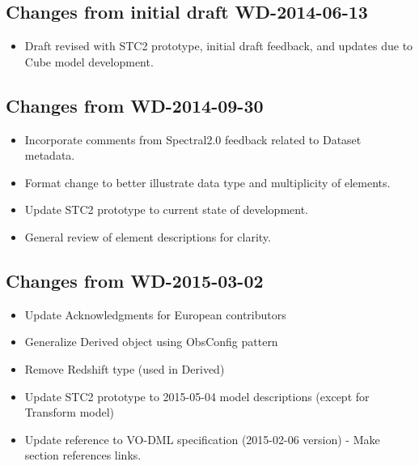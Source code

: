 

\subsection{Changes from initial draft WD-2014-06-13}
\begin{itemize} %
  \item  Draft revised with STC2 prototype, initial draft feedback, and updates due to Cube model development.
\end{itemize}

\subsection{Changes from WD-2014-09-30}
\begin{itemize} %
  \item Incorporate comments from Spectral2.0 feedback related to Dataset metadata.
  \item Format change to better illustrate data type and multiplicity of elements.
  \item Update STC2 prototype to current state of development.
  \item General review of element descriptions for clarity.
\end{itemize}

\subsection{Changes from WD-2015-03-02}
\begin{itemize} %
  \item Update Acknowledgments for European contributors
  \item Generalize Derived object using ObsConfig pattern
  \item Remove Redshift type (used in Derived)
  \item Update STC2 prototype to 2015-05-04 model descriptions (except for Transform model)
  \item Update reference to VO-DML specification (2015-02-06 version) - Make section references links.
\end{itemize}

